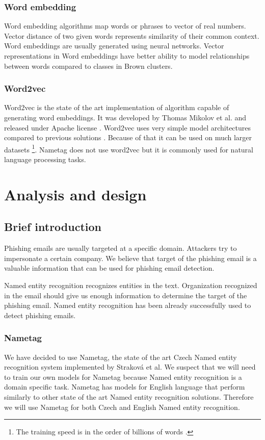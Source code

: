 \documentclass[thesis=B,english]{FITthesis}[2012/10/20]
\begin{document}
\subsection{Word embedding}
Word embedding algorithms map words or phrases to vector of real numbers. Vector distance of two given words represents similarity of their common context. Word embeddings are usually generated using neural networks. Vector representations in Word embeddings have better ability to model relationships between words compared to classes in Brown clusters.

\subsection{Word2vec}
Word2vec is the state of the art implementation of algorithm capable of generating word embeddings. It was developed by Thomas Mikolov et al. and released  under Apache license \cite{apacheLic2}. Word2vec uses very simple model architectures compared to previous solutions \cite{mikolov2013efficient}. Because of that it can be used on much larger datasets \footnote{The training speed is in the order of billions of words \cite{mikolov2013efficient}.}. Nametag does not use word2vec but it is commonly used for natural language processing tasks. \cite{strakova2016neural} \cite{lample2016neural}

\chapter{Analysis and design}
\section{Brief introduction}
Phishing emails are usually targeted at a specific domain. Attackers try to impersonate a certain company.
We believe that target of the phishing email is a valuable information that can be used for phishing email detection. 
\par Named entity recognition recognizes entities in the text. Organization recognized in the email should give us enough information to determine the target of the phishing email.
Named entity recognition has been already successfully used to detect phishing emails. \cite{indiaPaperMultiClassifier}

\subsection{Nametag}
\par We have decided to use Nametag, the state of the art Czech Named entity recognition system implemented by Strakov{\' a} et al. \cite{stateOfTheArtCzechNER}  
We suspect that we will need to train our own models for Nametag because Named entity recognition is a domain specific task.
Nametag has models for English language that perform similarly to other state of the art Named entity recognition solutions. Therefore we will use Nametag for both Czech and English Named entity recognition. 
\end{document}
